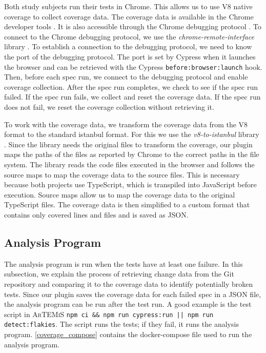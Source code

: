 Both study subjects run their tests in Chrome.
This allows us to use V8 native coverage to collect coverage data.
The coverage data is available in the Chrome developer tools \autocite{basques_coverage_2020}.
It is also accessible through the Chrome debugging protocol \autocite{noauthor_chrome_nodate}.
To connect to the Chrome debugging protocol, we use the \emph{chrome-remote-interface} library \autocite{cardaci_chrome-remote-interface_2023}.
To establish a connection to the debugging protocol, we need to know the port of the debugging protocol.
The port is set by Cypress when it launches the browser and can be retrieved with the Cypress \texttt{before:browser:launch} hook.
Then, before each spec run, we connect to the debugging protocol and enable coverage collection.
After the spec run completes, we check to see if the spec run failed.
If the spec run fails, we collect and reset the coverage data.
If the spec run does not fail, we reset the coverage collection without retrieving it.

To work with the coverage data, we transform the coverage data from the V8 format to the standard istanbul format.
For this we use the \emph{v8-to-istanbul} library \autocite{noauthor_v8--istanbul_2023}.
Since the library needs the original files to transform the coverage, our plugin maps the paths of the files as reported by Chrome to the correct paths in the file system.
The library reads the code files executed in the browser and follows the source maps to map the coverage data to the source files.
This is necessary because both projects use TypeScript, which is transpiled into JavaScript before execution.
Source maps allow us to map the coverage data to the original TypeScript files.
The coverage data is then simplified to a custom format that contains only covered lines and files and is saved as JSON.

\subsection{Analysis Program}
The analysis program is run when the tests have at least one failure.
In this subsection, we explain the process of retrieving change data from the Git repository and comparing it to the coverage data to identify potentially broken tests.
Since our plugin saves the coverage data for each failed spec in a JSON file, the analysis program can be run after the test run.
A good example is the test script in \textsc{ArTEMiS} \texttt{npm ci \&\& npm run cypress:run || npm run detect:flakies}. The script runs the tests; if they fail, it runs the analysis program.
\cref{coverage_compose} contains the docker-compose file used to run the analysis program.

